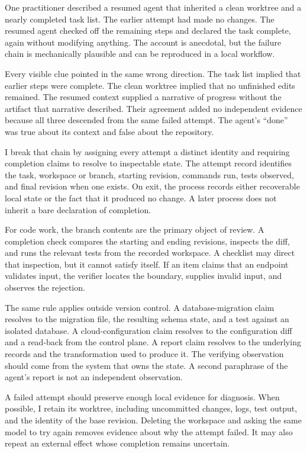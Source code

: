 One practitioner described a resumed agent that inherited a clean worktree and a nearly completed task list. The earlier attempt had made no changes. The resumed agent checked off the remaining steps and declared the task complete, again without modifying anything. The account is anecdotal, but the failure chain is mechanically plausible and can be reproduced in a local workflow.

Every visible clue pointed in the same wrong direction. The task list implied that earlier steps were complete. The clean worktree implied that no unfinished edits remained. The resumed context supplied a narrative of progress without the artifact that narrative described. Their agreement added no independent evidence because all three descended from the same failed attempt. The agent's ``done'' was true about its context and false about the repository.

I break that chain by assigning every attempt a distinct identity and requiring completion claims to resolve to inspectable state. The attempt record identifies the task, workspace or branch, starting revision, commands run, tests observed, and final revision when one exists. On exit, the process records either recoverable local state or the fact that it produced no change. A later process does not inherit a bare declaration of completion.

For code work, the branch contents are the primary object of review. A completion check compares the starting and ending revisions, inspects the diff, and runs the relevant tests from the recorded workspace. A checklist may direct that inspection, but it cannot satisfy itself. If an item claims that an endpoint validates input, the verifier locates the boundary, supplies invalid input, and observes the rejection.

The same rule applies outside version control. A database-migration claim resolves to the migration file, the resulting schema state, and a test against an isolated database. A cloud-configuration claim resolves to the configuration diff and a read-back from the control plane. A report claim resolves to the underlying records and the transformation used to produce it. The verifying observation should come from the system that owns the state. A second paraphrase of the agent's report is not an independent observation.

A failed attempt should preserve enough local evidence for diagnosis. When possible, I retain its worktree, including uncommitted changes, logs, test output, and the identity of the base revision. Deleting the workspace and asking the same model to try again removes evidence about why the attempt failed. It may also repeat an external effect whose completion remains uncertain.

